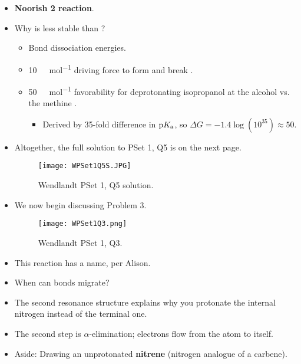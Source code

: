 \documentclass[../notes.tex]{subfiles}
\begin{document}
\begin{itemize}
    \begin{figure}[h!]
        \centering
        \texttt{[image: WPSet1Q5.png]}
        \caption{Wendlandt PSet 1, Q5.}
        \label{fig:WPSet1Q5}
    \end{figure}
    \item \textbf{Noorish 2 reaction}.
    \item Why is  less stable than ?
    \begin{itemize}
        \item Bond dissociation energies.
        \item \SI{10}{\kilo\calorie\per\mole} driving force to form  and break .
        \item \SI{50}{\kilo\calorie\per\mole} favorability for deprotonating isopropanol at the alcohol vs. the methine .
        \begin{itemize}
            \item Derived by 35-fold difference in $\textup{p}K_\textup{a}$, so $\Delta G=-1.4\log(10^{35})\approx 50$.
        \end{itemize}
    \end{itemize}
    \item Altogether, the full solution to PSet 1, Q5 is on the next page.
    \begin{figure}[h!]
        \centering
        \texttt{[image: WPSet1Q5S.JPG]}
        \caption{Wendlandt PSet 1, Q5 solution.}
        \label{fig:WPSet1Q5S}
    \end{figure}
    \pagebreak
    \item We now begin discussing Problem 3.
    \begin{figure}[h!]
        \centering
        \texttt{[image: WPSet1Q3.png]}
        \caption{Wendlandt PSet 1, Q3.}
        \label{fig:WPSet1Q3}
    \end{figure}
    \item This reaction has a name, per Alison.
    \item When can  bonds migrate?
    \item The second resonance structure explains why you protonate the internal nitrogen instead of the terminal one.
    \item The second step is $\alpha$-elimination; electrons flow from the atom to itself.
    \item Aside: Drawing an unprotonated \textbf{nitrene} (nitrogen analogue of a carbene).
    \begin{itemize}

\end{itemize}
\end{itemize}
\end{document}
